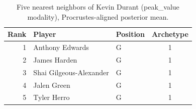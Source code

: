 \begin{table}[htbp]
  \centering\small
  \begin{tabular}{rllc}
    \toprule
    Rank & Player & Position & Archetype \\
    \midrule
    1 & Anthony Edwards & G & 1 \\
    2 & James Harden & G & 1 \\
    3 & Shai Gilgeous-Alexander & G & 1 \\
    4 & Jalen Green & G & 1 \\
    5 & Tyler Herro & G & 1 \\
    \bottomrule
  \end{tabular}
  \caption{Five nearest neighbors of Kevin Durant (peak_value modality), Procrustes-aligned posterior mean.}
  \label{tab:Kevin_Durant_neighbors_peak_value}
\end{table}

